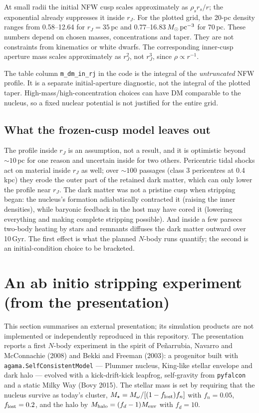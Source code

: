 \documentclass[11pt,a4paper]{article}
\begin{document}
At small radii the initial NFW cusp scales approximately as $\rho_s r_s/r$; the
exponential already suppresses it inside $r_J$. For the plotted grid, the 20-pc density
ranges from 0.58--12.64 for $r_J=35$\,pc and 0.77--16.83\,$M_\odot\,{\rm pc^{-3}}$ for
70\,pc. These numbers depend on chosen masses, concentrations and taper. They are not
constraints from kinematics or white dwarfs. The corresponding inner-cusp aperture mass
scales approximately as $r_J^2$, not $r_J^3$, since $\rho\propto r^{-1}$.

The table column \texttt{m\_dm\_in\_rj} in the code is the integral of the \emph{untruncated}
NFW profile. It is a separate initial-aperture diagnostic, not the integral of the plotted
taper. High-mass/high-concentration choices can have DM comparable to the nucleus, so a
fixed nuclear potential is not justified for the entire grid.

\subsection{What the frozen-cusp model leaves out}
The profile inside $r_J$ is an assumption, not a result, and it is optimistic beyond $\sim10$\,pc for one reason and uncertain inside for two others. Pericentric tidal shocks act on material inside $r_J$ as well; over $\sim100$ passages (class 3 pericentres at 0.4\,kpc) they erode the outer part of the retained dark matter, which can only lower the profile near $r_J$. The dark matter was not a pristine cusp when stripping began: the nucleus's formation adiabatically contracted it (raising the inner densities), while baryonic feedback in the host may have cored it (lowering everything and making complete stripping possible). And inside a few parsecs two-body heating by stars and remnants diffuses the dark matter outward over 10\,Gyr. The first effect is what the planned $N$-body runs quantify; the second is an initial-condition choice to be bracketed.


\section{An ab initio stripping experiment (from the presentation)}
\label{sec:agama}

This section summarises an external presentation; its simulation products are not
implemented or independently reproduced in this repository. The presentation reports a first $N$-body experiment in the spirit of Pe\~narrubia, Navarro and McConnachie (2008) and Bekki and Freeman (2003): a progenitor built with \texttt{agama.SelfConsistentModel} --- Plummer nucleus, King-like stellar envelope and dark halo --- evolved with a kick-drift-kick leapfrog, self-gravity from \texttt{pyfalcon} and a static Milky Way (Bovy 2015). The stellar mass is set by requiring that the nucleus survive as today's cluster, $M_\star=M_\omega/[(1-f_{\rm lost})f_n]$ with $f_n=0.05$, $f_{\rm lost}=0.2$, and the halo by $M_{\rm halo}=(f_d-1)M_{\rm env}$ with $f_d=10$.
\end{document}
